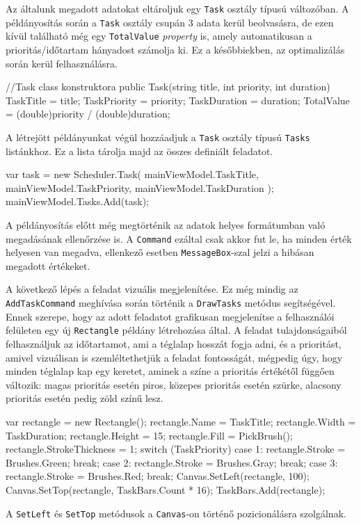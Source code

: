 Az általunk megadott adatokat eltároljuk egy \texttt{Task} osztály típusú változóban. A példányosítás során a \texttt{Task} osztály csupán 3 adata kerül beolvasásra, de ezen kívül található még egy \texttt{TotalValue} \textit{property} is, amely automatikusan a prioritás/időtartam hányadost számolja ki. Ez a későbbiekben, az optimalizálás során kerül felhasználásra.
\begin{java}
//Task class konstruktora
public Task(string title, int priority, int duration)
{
    TaskTitle = title;
    TaskPriority = priority;
    TaskDuration = duration;
    TotalValue = (double)priority / (double)duration;
}	
\end{java}
A létrejött példányunkat végül hozzáadjuk a \texttt{Task} osztály típusú \texttt{Tasks} listánkhoz. Ez a lista tárolja majd az összes definiált feladatot.
\begin{java}
    var task = new Scheduler.Task(
        mainViewModel.TaskTitle,
        mainViewModel.TaskPriority,
        mainViewModel.TaskDuration
    );
    mainViewModel.Tasks.Add(task);
\end{java}
A példányosítás előtt még megtörténik az adatok helyes formátumban való megadásának ellenőrzése is. A \texttt{Command} ezáltal csak akkor fut le, ha minden érték helyesen van megadva, ellenkező esetben \texttt{MessageBox}-szal jelzi a hibásan megadott értékeket.


A következő lépés a feladat vizuális megjelenítése. Ez még mindig az \texttt{AddTaskCommand} meghívása során történik a \texttt{DrawTasks} metódus segítségével. Ennek szerepe, hogy az adott feladatot grafikusan megjelenítse a felhasználói felületen egy új \texttt{Rectangle} példány létrehozása által. A feladat tulajdonságaiból felhasználjuk az időtartamot, ami a téglalap hosszát fogja adni, és a prioritást, amivel vizuálisan is szemléltethetjük a feladat fontosságát, mégpedig úgy, hogy minden téglalap kap egy keretet, aminek a színe a prioritás értékétől függően változik: magas prioritás esetén piros, közepes prioritás esetén szürke, alacsony prioritás esetén pedig zöld színű lesz.
\begin{java}
var rectangle = new Rectangle();
rectangle.Name = TaskTitle;
rectangle.Width = TaskDuration;
rectangle.Height = 15;
rectangle.Fill = PickBrush();
rectangle.StrokeThickness = 1;
switch (TaskPriority)
{
case 1:
    rectangle.Stroke = Brushes.Green;
    break;
case 2:
    rectangle.Stroke = Brushes.Gray;
    break;
case 3:
    rectangle.Stroke = Brushes.Red;
    break;
}
Canvas.SetLeft(rectangle, 100);
Canvas.SetTop(rectangle, TaskBars.Count * 16);
TaskBars.Add(rectangle);
\end{java}
A \texttt{SetLeft} és \texttt{SetTop} metódusok a \texttt{Canvas}-on történő pozicionálásra szolgálnak.

